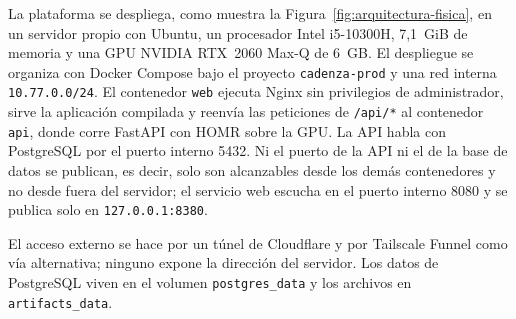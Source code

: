 \documentclass[conference]{IEEEtran}
\begin{document}
La plataforma se despliega, como muestra la
Figura~\ref{fig:arquitectura-fisica}, en un servidor propio con Ubuntu, un procesador
Intel i5-10300H, 7,1~GiB de memoria y una GPU NVIDIA RTX~2060 Max-Q de
6~GB.
El despliegue se organiza con Docker Compose bajo el proyecto
\texttt{cadenza-prod} y una red interna \texttt{10.77.0.0/24}. El
contenedor \texttt{web} ejecuta Nginx sin privilegios de administrador,
sirve la aplicación compilada y reenvía las peticiones de \texttt{/api/*}
al contenedor \texttt{api}, donde corre FastAPI con HOMR sobre la GPU. La
API habla con PostgreSQL por el puerto interno 5432. Ni el puerto de la API
ni el de la base de datos se publican, es decir, solo son alcanzables
desde los demás contenedores y no desde fuera del servidor; el servicio web escucha en el puerto
interno 8080 y se publica solo en \texttt{127.0.0.1:8380}.

El acceso externo se hace por un túnel de Cloudflare y por Tailscale
Funnel como vía alternativa; ninguno expone la dirección del servidor.
Los datos de PostgreSQL viven en el volumen \texttt{postgres\_data} y los
archivos en \texttt{artifacts\_data}.
\end{document}
